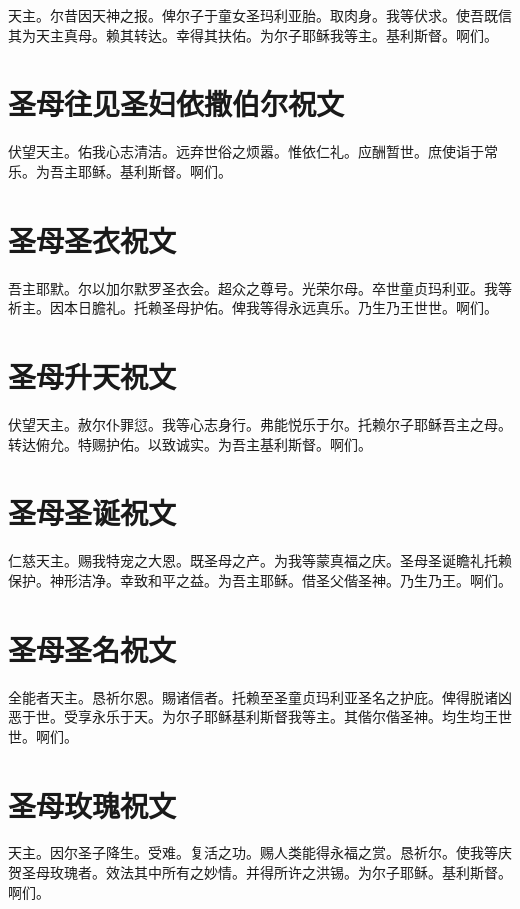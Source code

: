 \documentclass[UTF8,17pt]{ctexart}
\begin{document}
天主。尔昔因天神之报。俾尔⼦于童⼥圣玛利亚胎。取⾁⾝。我等伏求。使吾既信其为天主真母。赖其转达。幸得其扶佑。为尔⼦耶稣我等主。基利斯督。啊们。

\section{圣母往见圣妇依撒伯尔祝⽂}

伏望天主。佑我⼼志清洁。远弃世俗之烦嚣。惟依仁礼。应酬暂世。庶使诣于常乐。为吾主耶稣。基利斯督。啊们。

\section{圣母圣⾐祝⽂}

吾主耶默。尔以加尔默罗圣衣会。超众之尊号。光荣尔母。卒世童贞玛利亚。我等祈主。因本⽇膽礼。托赖圣母护佑。俾我等得永远真乐。乃⽣乃王世世。啊们。

\section{圣母升天祝⽂}

伏望天主。赦尔仆罪愆。我等⼼志⾝⾏。弗能悦乐于尔。托赖尔⼦耶稣吾主之母。转达俯允。特赐护佑。以致诚实。为吾主基利斯督。啊们。

\section{圣母圣诞祝⽂}

仁慈天主。赐我特宠之⼤恩。既圣母之产。为我等蒙真福之庆。圣母圣诞瞻礼托赖保护。神形洁净。幸致和平之益。为吾主耶稣。借圣⽗偕圣神。乃⽣乃王。啊们。

\section{圣母圣名祝⽂}

全能者天主。恳祈尔恩。賜诸信者。托赖⾄圣童贞玛利亚圣名之护庇。俾得脱诸凶恶于世。受享永乐于天。为尔⼦耶稣基利斯督我等主。其偕尔偕圣神。均⽣均王世世。啊们。

\section{圣母玫瑰祝⽂}

天主。因尔圣⼦降⽣。受难。复活之功。赐⼈类能得永福之赏。恳祈尔。使我等庆贺圣母玫瑰者。效法其中所有之妙情。并得所许之洪锡。为尔⼦耶稣。基利斯督。啊们。
\end{document}
